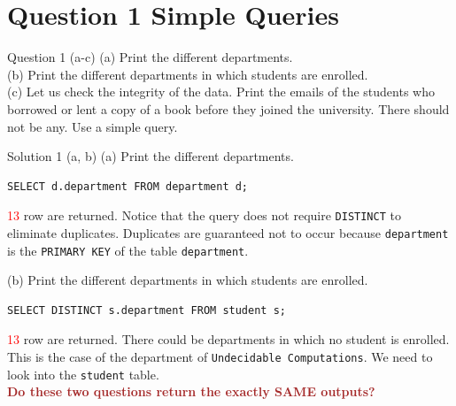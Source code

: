 \section*{Question 1 Simple Queries}

\begin{frame}[fragile]{Question 1 (a-c)}
	(a) Print the different departments.\\ \vspace{5pt}
	(b) Print the different departments in which students are enrolled. \\ \vspace{5pt}
	(c) Let us check the integrity of the data. Print the emails of the students who borrowed or lent a copy of a book before they joined the university. There should not be any. Use a simple query.  
\end{frame}

\begin{frame}[fragile]{Solution 1 (a, b)}
(a) Print the different departments.\\ \vspace{5pt}

\begin{lstlisting}		
SELECT d.department FROM department d;
\end{lstlisting}

\textcolor{red}{13} row are returned.
Notice that the query does not require \texttt{DISTINCT} to eliminate duplicates. Duplicates are guaranteed not to occur because \texttt{department} is the \texttt{PRIMARY KEY} of the table \texttt{department}. \vspace{10pt}

(b) Print the different departments in which students are enrolled. \\ \vspace{5pt}

\begin{lstlisting}
SELECT DISTINCT s.department FROM student s;
\end{lstlisting}

\textcolor{red}{13} row are returned.
There could be departments in which no student is enrolled. This is the case of the department of \texttt{Undecidable Computations}.  We need to look into the \texttt{student} table.
\\\vspace{10pt}
\textcolor{brown}{\textbf{Do these two questions return the exactly SAME outputs?}}

\end{frame}

